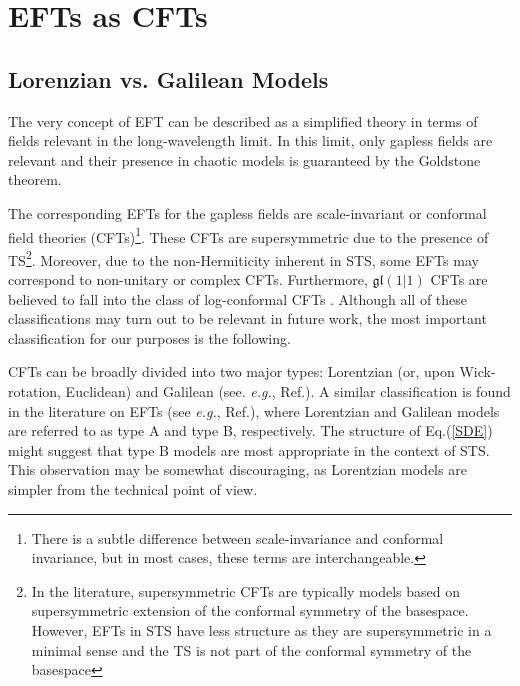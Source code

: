 \documentclass[final,5p,10pt,times,twocolumn,year]{elsarticle}
\begin{document}
\section{EFTs as CFTs}
\label{Sec:CFT}
\subsection{Lorenzian vs. Galilean Models} 
\label{Lorenzian_Galilean}

The very concept of EFT can be described as a simplified theory in terms of fields relevant in the long-wavelength limit. In this limit, only gapless fields are relevant and their presence in chaotic models is guaranteed by the Goldstone theorem. 

The corresponding EFTs for the gapless fields are scale-invariant or conformal field theories (CFTs)\footnote{There is a subtle difference between scale-invariance and conformal invariance, but in most cases, these terms are interchangeable.}. These CFTs are supersymmetric due to the presence of TS\footnote{In the literature, supersymmetric CFTs are typically models based on supersymmetric extension of the conformal symmetry of the basespace. However, EFTs in STS have less structure as they are supersymmetric in a minimal sense and the TS is not part of the conformal symmetry of the basespace}. Moreover, due to the non-Hermiticity inherent in STS, some EFTs may correspond to non-unitary\cite{NonUnitaryCFTs} or complex \cite{ComplexCFTs,PhysRevLett.133.076504} CFTs. Furthermore, $\mathfrak{gl}(1|1)$ CFTs are believed to fall into the class of log-conformal CFTs \cite{GL1_1WZ_2005}. Although all of these classifications may turn out to be relevant in future work, the most important classification for our purposes is the following.

CFTs can be broadly divided into two major types: Lorentzian (or, upon Wick-rotation, Euclidean) and Galilean (see. \emph{e.g.}, Ref.\cite{Arjun_Bagchi_2009}).  A similar classification is found in the literature on EFTs (see \emph{e.g.}, Ref.\cite{RFT_SSB_book}), where Lorentzian and Galilean models are referred to as type A and type B, respectively. The structure of Eq.(\ref{SDE}) might suggest that type B models are most appropriate in the context of STS. This observation may be somewhat discouraging, as Lorentzian models are simpler from the technical point of view.
\end{document}
